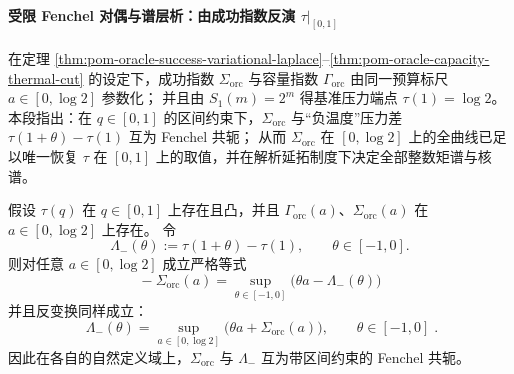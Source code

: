 \paragraph{受限 Fenchel 对偶与谱层析：由成功指数反演 \texorpdfstring{$\tau|_{[0,1]}$}{tau on [0,1]}}
在定理 \ref{thm:pom-oracle-success-variational-laplace}--\ref{thm:pom-oracle-capacity-thermal-cut} 的设定下，成功指数 \(\Sigma_{\mathrm{orc}}\) 与容量指数 \(\Gamma_{\mathrm{orc}}\) 由同一预算标尺 \(a\in[0,\log 2]\) 参数化；
并且由 \(S_1(m)=2^m\) 得基准压力端点 \(\tau(1)=\log 2\)。
本段指出：在 \(q\in[0,1]\) 的区间约束下，\(\Sigma_{\mathrm{orc}}\) 与“负温度”压力差 \(\tau(1+\theta)-\tau(1)\) 互为 Fenchel 共轭；
从而 \(\Sigma_{\mathrm{orc}}\) 在 \([0,\log 2]\) 上的全曲线已足以唯一恢复 \(\tau\) 在 \([0,1]\) 上的取值，并在解析延拓制度下决定全部整数矩谱与核谱。

\begin{theorem}\label{thm:pom-oracle-restricted-fenchel-duality-negative-temp}
假设 \(\tau(q)\) 在 \(q\in[0,1]\) 上存在且凸，并且 \(\Gamma_{\mathrm{orc}}(a)\)、\(\Sigma_{\mathrm{orc}}(a)\) 在 \(a\in[0,\log 2]\) 上存在。
令
\[
\Lambda_{-}(\theta):=\tau(1+\theta)-\tau(1),\qquad \theta\in[-1,0].
\]
则对任意 \(a\in[0,\log 2]\) 成立严格等式
\[
\boxed{\;
-\Sigma_{\mathrm{orc}}(a)=\sup_{\theta\in[-1,0]}\bigl(\theta a-\Lambda_{-}(\theta)\bigr)\;}
\]
并且反变换同样成立：
\[
\boxed{\;
\Lambda_{-}(\theta)=\sup_{a\in[0,\log 2]}\bigl(\theta a+\Sigma_{\mathrm{orc}}(a)\bigr),\qquad \theta\in[-1,0]\; }.
\]
因此在各自的自然定义域上，\(\Sigma_{\mathrm{orc}}\) 与 \(\Lambda_{-}\) 互为带区间约束的 Fenchel 共轭。
\end{theorem}
